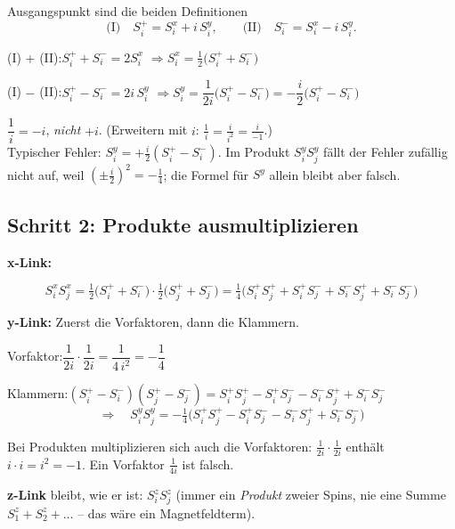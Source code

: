 \documentclass[11pt,a4paper]{article}
\begin{document}
Ausgangspunkt sind die beiden Definitionen
\[
\text{(I)}\quad S^+_i = S^x_i + i\,S^y_i,\qquad \text{(II)}\quad S^-_i = S^x_i - i\,S^y_i .
\]

\begin{rechnung}
(I) + (II):\quad $S^+_i + S^-_i = 2S^x_i$ \quad$\Rightarrow$\quad $S^x_i = \tfrac12\big(S^+_i + S^-_i\big)$

(I) $-$ (II):\quad $S^+_i - S^-_i = 2i\,S^y_i$ \quad$\Rightarrow$\quad $S^y_i = \dfrac{1}{2i}\big(S^+_i - S^-_i\big) = -\dfrac{i}{2}\big(S^+_i - S^-_i\big)$
\end{rechnung}

\begin{falle}
$\dfrac1i = -i$, \emph{nicht} $+i$. (Erweitern mit $i$: $\tfrac1i = \tfrac{i}{i^2} = \tfrac{i}{-1}$.) \\
Typischer Fehler: $S^y_i = +\tfrac{i}{2}(S^+_i - S^-_i)$. Im Produkt $S^y_iS^y_j$ fällt der Fehler zufällig nicht auf, weil $(\pm\tfrac i2)^2 = -\tfrac14$; die Formel für $S^y$ allein bleibt aber falsch.
\end{falle}

\subsection{Schritt 2: Produkte ausmultiplizieren}

\textbf{x-Link:}
\begin{rechnung}
\[
S^x_iS^x_j = \tfrac12\big(S^+_i + S^-_i\big)\cdot\tfrac12\big(S^+_j + S^-_j\big)
= \tfrac14\big(S^+_iS^+_j + S^+_iS^-_j + S^-_iS^+_j + S^-_iS^-_j\big)
\]
\end{rechnung}

\textbf{y-Link:} Zuerst die Vorfaktoren, dann die Klammern.
\begin{rechnung}
Vorfaktor:\quad $\dfrac{1}{2i}\cdot\dfrac{1}{2i} = \dfrac{1}{4\,i^2} = -\dfrac14$

Klammern:\quad $(S^+_i - S^-_i)(S^+_j - S^-_j) = S^+_iS^+_j - S^+_iS^-_j - S^-_iS^+_j + S^-_iS^-_j$
\[
\Rightarrow\quad S^y_iS^y_j = -\tfrac14\big(S^+_iS^+_j - S^+_iS^-_j - S^-_iS^+_j + S^-_iS^-_j\big)
\]
\end{rechnung}

\begin{falle}
Bei Produkten multiplizieren sich auch die Vorfaktoren: $\tfrac{1}{2i}\cdot\tfrac{1}{2i}$ enthält $i\cdot i = i^2 = -1$. Ein Vorfaktor $\tfrac{1}{4i}$ ist falsch.
\end{falle}

\textbf{z-Link} bleibt, wie er ist: $S^z_iS^z_j$ (immer ein \emph{Produkt} zweier Spins, nie eine Summe $S^z_1 + S^z_2 + \dots$ -- das wäre ein Magnetfeldterm).
\end{document}
